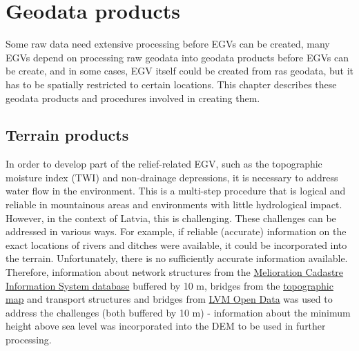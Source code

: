 \documentclass[
]{book}
\begin{document}
\chapter{Geodata products}\label{Ch05}

Some raw data need extensive processing before EGVs can be created, many EGVs
depend on processing raw geodata into geodata products before EGVs can be create,
and in some cases, EGV itself could be created from ras geodata, but it has
to be spatially restricted to certain locations. This chapter describes these geodata
products and procedures involved in creating them.

\section{Terrain products}\label{Ch05.01}

In order to develop part of the relief-related EGV, such as the topographic
moisture index (TWI) and non-drainage depressions, it is necessary to address
water flow in the environment. This is a multi-step procedure that is logical
and reliable in mountainous areas and environments with little hydrological
impact. However, in the context of Latvia, this is challenging. These challenges
can be addressed in various ways. For example, if reliable (accurate) information
on the exact locations of rivers and ditches were available, it could be
incorporated into the terrain. Unfortunately, there is no sufficiently
accurate information available. Therefore, information about network
structures from the \hyperref[Ch04.03]{Melioration Cadastre Information System database}
buffered by 10 m, bridges from the \hyperref[Ch04.04]{topographic map} and transport structures and bridges
from \hyperref[Ch04.06]{LVM Open Data} was used to address the challenges (both buffered
by 10 m) - information about the minimum height above sea level was incorporated into the
DEM to be used in further processing.
\end{document}
